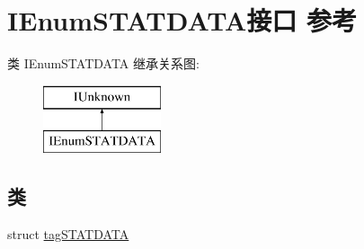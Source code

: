 \hypertarget{interface_i_enum_s_t_a_t_d_a_t_a}{}\section{I\+Enum\+S\+T\+A\+T\+D\+A\+T\+A接口 参考}
\label{interface_i_enum_s_t_a_t_d_a_t_a}
类 I\+Enum\+S\+T\+A\+T\+D\+A\+TA 继承关系图\+:\begin{figure}[H]
\begin{center}
\leavevmode
\includegraphics[height=2.000000cm]{interface_i_enum_s_t_a_t_d_a_t_a}
\end{center}
\end{figure}
\subsection*{类}
\begin{DoxyCompactItemize}
\item 
struct \hyperlink{struct_i_enum_s_t_a_t_d_a_t_a_1_1tag_s_t_a_t_d_a_t_a}{tag\+S\+T\+A\+T\+D\+A\+TA}
\end{DoxyCompactItemize}
